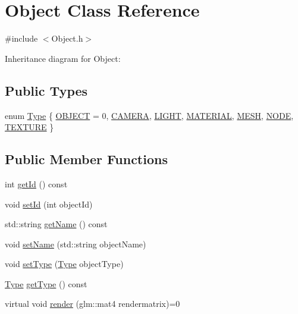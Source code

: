 \hypertarget{classObject}{}\section{Object Class Reference}
\label{classObject}


{\ttfamily \#include $<$Object.\+h$>$}



Inheritance diagram for Object\+:
\subsection*{Public Types}
\begin{DoxyCompactItemize}
\item 
enum \hyperlink{classObject_ad8dadb365053c182931671a424199e36}{Type} \{ \newline
\hyperlink{classObject_ad8dadb365053c182931671a424199e36ad7c3b780cc411a9b2bca5c893bf058d9}{O\+B\+J\+E\+CT} = 0, 
\hyperlink{classObject_ad8dadb365053c182931671a424199e36a9d820291fd75d33b2108aec3577bdeb6}{C\+A\+M\+E\+RA}, 
\hyperlink{classObject_ad8dadb365053c182931671a424199e36a2c3992641cd104186ff698ed3af9fe77}{L\+I\+G\+HT}, 
\hyperlink{classObject_ad8dadb365053c182931671a424199e36a33752e3fe4c2b26f5f945568aa8e7f7c}{M\+A\+T\+E\+R\+I\+AL}, 
\newline
\hyperlink{classObject_ad8dadb365053c182931671a424199e36a233f5c2a87bcc6d1ab8a6f831578f3a0}{M\+E\+SH}, 
\hyperlink{classObject_ad8dadb365053c182931671a424199e36a9a306e7d310391d25eb73ad6a1d3c729}{N\+O\+DE}, 
\hyperlink{classObject_ad8dadb365053c182931671a424199e36a0832fb173ad4ea78e71d34d6e6532d45}{T\+E\+X\+T\+U\+RE}
 \}
\end{DoxyCompactItemize}
\subsection*{Public Member Functions}
\begin{DoxyCompactItemize}
\item 
int \hyperlink{classObject_af3558f9e2b46d677f0ac4d6d3c97b118}{get\+Id} () const
\item 
void \hyperlink{classObject_a7ab65dbfd0a7c93266d3303330718be4}{set\+Id} (int object\+Id)
\item 
std\+::string \hyperlink{classObject_acb9b466607cb80beaaa30ece2f7f570a}{get\+Name} () const
\item 
void \hyperlink{classObject_a93052cbcc55dd5ca96d87f45a2af893f}{set\+Name} (std\+::string object\+Name)
\item 
void \hyperlink{classObject_a1fad7c569e1a3dbd84b97136825bb1dd}{set\+Type} (\hyperlink{classObject_ad8dadb365053c182931671a424199e36}{Type} object\+Type)
\item 
\hyperlink{classObject_ad8dadb365053c182931671a424199e36}{Type} \hyperlink{classObject_a9bb97ab8fe1c83ce6dbbb19cba53a578}{get\+Type} () const
\item 
virtual void \hyperlink{classObject_af7b5e6c789269f331688537c0809fb82}{render} (glm\+::mat4 rendermatrix)=0
\end{DoxyCompactItemize}


